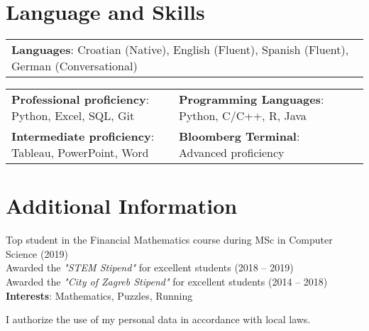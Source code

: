 \documentclass[letterpaper,11pt]{article}
\begin{document}
%
\section{Language and Skills}
\begin{center}
\begin{tabularx}{0.96\textwidth} { 
  >{\raggedright\arraybackslash}X
}
  \small{\textbf{Languages}: Croatian (Native), English (Fluent), Spanish (Fluent), German (Conversational)}
\end{tabularx}
\end{center}

\begin{center}
\begin{tabularx}{0.96\textwidth} { 
  >{\raggedright\arraybackslash}X 
   >{\raggedright\arraybackslash}X 
   >{\raggedright\arraybackslash}X 
   >{\raggedright\arraybackslash}X
}
\small{\textbf{Professional proficiency}: Python, Excel, SQL, Git} & \small{\hspace{3pt}\textbf{Programming Languages}: Python, C/C++, R, Java} \\
\small{\textbf{Intermediate proficiency}: Tableau, PowerPoint, Word} & \small{\hspace{3pt}\textbf{Bloomberg Terminal}: Advanced proficiency} \\
\end{tabularx}
\end{center}



\section{Additional Information}
\begin{itemize}[leftmargin=0.15in, label={}]
  \small{\item{
     Top student in the Financial Mathematics course during MSc in Computer Science (2019) \\
     Awarded the \textit{"STEM Stipend"} for excellent students (2018 -- 2019) \\
     Awarded the \textit{"City of Zagreb Stipend"} for excellent students (2014 -- 2018) \\ \vspace{3pt}
     \textbf{Interests}: Mathematics, Puzzles, Running
    }}
\end{itemize}

\mbox{}
\vfill
I authorize the use of my personal data in accordance with local laws.


\end{document}

